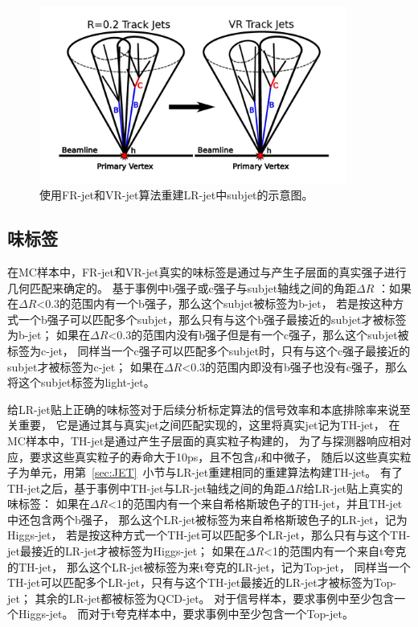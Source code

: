 \begin{figure}
  \begin{center}
    \includegraphics[width=0.9\textwidth]{figuresEXP/ATLASJET2.jpg}
  \end{center}
  \caption{
使用FR-jet和VR-jet算法重建LR-jet中subjet的示意图。
  }
    \label{fig:ATLASJET2}
\end{figure}


\subsection{味标签}
\label{sec:XbbORFT}

在MC样本中，FR-jet和VR-jet真实的味标签是通过与产生子层面的真实强子进行几何匹配来确定的。
基于事例中b强子或c强子与subjet轴线之间的角距$\Delta R$
：如果在$\Delta R$<0.3的范围内有一个b强子，那么这个subjet被标签为b-jet，
若是按这种方式一个b强子可以匹配多个subjet，那么只有与这个b强子最接近的subjet才被标签为b-jet；
如果在$\Delta R$<0.3的范围内没有b强子但是有一个c强子，那么这个subjet被标签为c-jet，
同样当一个c强子可以匹配多个subjet时，只有与这个c强子最接近的subjet才被标签为c-jet；
如果在$\Delta R$<0.3的范围内即没有b强子也没有c强子，那么将这个subjet标签为light-jet。

给LR-jet贴上正确的味标签对于后续分析标定算法的信号效率和本底排除率来说至关重要，
它是通过其与真实jet之间匹配实现的，这里将真实jet记为TH-jet，
在MC样本中，TH-jet是通过产生子层面的真实粒子构建的，
为了与探测器响应相对应，要求这些真实粒子的寿命大于10ps，且不包含$\mu$和中微子，
随后以这些真实粒子为单元，用第~\ref{sec:JET}~小节与LR-jet重建相同的重建算法构建TH-jet。
有了TH-jet之后，基于事例中TH-jet与LR-jet轴线之间的角距$\Delta R$给LR-jet贴上真实的味标签：
如果在$\Delta R$<1的范围内有一个来自希格斯玻色子的TH-jet，并且TH-jet中还包含两个b强子，
那么这个LR-jet被标签为来自希格斯玻色子的LR-jet，记为Higgs-jet，
若是按这种方式一个TH-jet可以匹配多个LR-jet，那么只有与这个TH-jet最接近的LR-jet才被标签为Higgs-jet；
如果在$\Delta R$<1的范围内有一个来自t夸克的TH-jet，
那么这个LR-jet被标签为来t夸克的LR-jet，记为Top-jet，
同样当一个TH-jet可以匹配多个LR-jet，只有与这个TH-jet最接近的LR-jet才被标签为Top-jet；
其余的LR-jet都被标签为QCD-jet。
对于信号样本，要求事例中至少包含一个Higgs-jet。
而对于t夸克样本中，要求事例中至少包含一个Top-jet。

